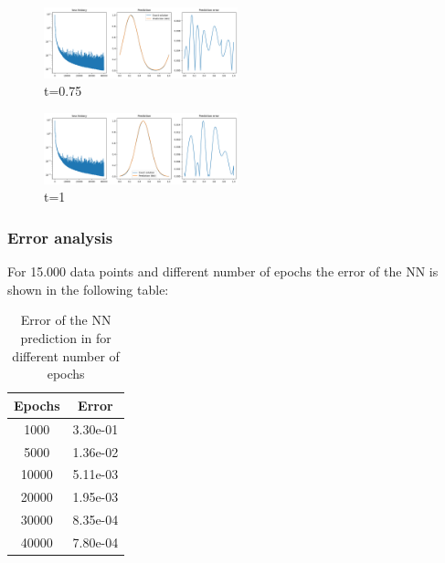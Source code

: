 \documentclass{article}
\begin{document}
\begin{figure}[!h]
    \centering
    \includegraphics[width=0.5\textwidth]{images/r4.png}
    \caption{t=0.75}
\end{figure}

\begin{figure}[!h]
    \centering
    \includegraphics[width=0.5\textwidth]{images/r5.png}
    \caption{t=1}
\end{figure} 

\newpage 

\subsubsection*{Error analysis}

For 15.000 data points and different number of epochs the error of the NN is shown in the following table:

\begin{table}[!h]
    \centering
    \begin{tabular}{|c|c|}
    \hline
    \textbf{Epochs} & \textbf{Error} \\ \hline
    1000            & 3.30e-01       \\ \hline
    5000            & 1.36e-02       \\ \hline
    10000           & 5.11e-03       \\ \hline
    20000           & 1.95e-03       \\ \hline
    30000           & 8.35e-04        \\ \hline
    40000           & 7.80e-04        \\ \hline
    \end{tabular}
    \caption{Error of the NN prediction in for different number of epochs}
    \label{tab:my-table}
\end{table}
\end{document}
